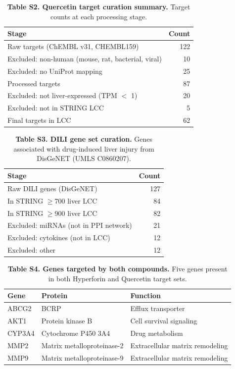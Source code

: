 \begin{table}[ht]
\centering
\caption{\textbf{Table S2. Quercetin target curation summary.}
Target counts at each processing stage.}
\label{tab:S2}
\vspace{0.5em}
\begin{tabular}{lr}
\toprule
\textbf{Stage} & \textbf{Count} \\
\midrule
Raw targets (ChEMBL v31, CHEMBL159) & 122 \\
Excluded: non-human (mouse, rat, bacterial, viral) & 10 \\
Excluded: no UniProt mapping & 25 \\
Processed targets & 87 \\
Excluded: not liver-expressed (TPM $<$ 1) & 20 \\
Excluded: not in STRING LCC & 5 \\
Final targets in LCC & 62 \\
\bottomrule
\end{tabular}
\end{table}

\begin{table}[ht]
\centering
\caption{\textbf{Table S3. DILI gene set curation.}
Genes associated with drug-induced liver injury from DisGeNET (UMLS C0860207).}
\label{tab:S3}
\vspace{0.5em}
\begin{tabular}{lr}
\toprule
\textbf{Stage} & \textbf{Count} \\
\midrule
Raw DILI genes (DisGeNET) & 127 \\
In STRING $\geq$700 liver LCC & 84 \\
In STRING $\geq$900 liver LCC & 82 \\
Excluded: miRNAs (not in PPI network) & 21 \\
Excluded: cytokines (not in LCC) & 12 \\
Excluded: other & 12 \\
\bottomrule
\end{tabular}
\end{table}

\begin{table}[ht]
\centering
\caption{\textbf{Table S4. Genes targeted by both compounds.}
Five genes present in both Hyperforin and Quercetin target sets.}
\label{tab:S4}
\vspace{0.5em}
\begin{tabular}{lll}
\toprule
\textbf{Gene} & \textbf{Protein} & \textbf{Function} \\
\midrule
ABCG2 & BCRP & Efflux transporter \\
AKT1 & Protein kinase B & Cell survival signaling \\
CYP3A4 & Cytochrome P450 3A4 & Drug metabolism \\
MMP2 & Matrix metalloproteinase-2 & Extracellular matrix remodeling \\
MMP9 & Matrix metalloproteinase-9 & Extracellular matrix remodeling \\
\bottomrule
\end{tabular}
\end{table}


